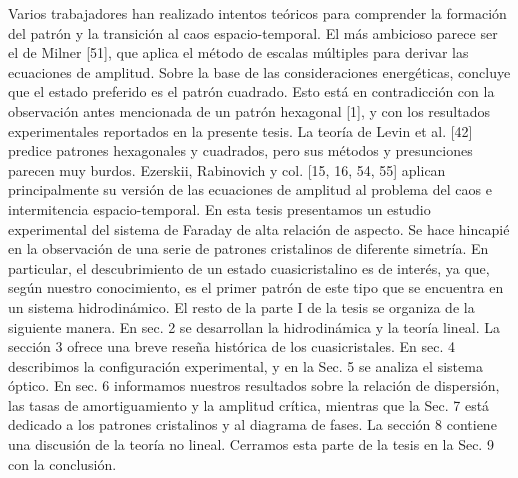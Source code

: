 Varios trabajadores han realizado intentos teóricos para comprender la formación del patrón y la transición al caos espacio-temporal. El más ambicioso parece ser el de Milner [51], que aplica el método de escalas múltiples para derivar las ecuaciones de amplitud. Sobre la base de las consideraciones energéticas, concluye que el estado preferido es el patrón cuadrado. Esto está en contradicción con la observación antes mencionada de un patrón hexagonal [1], y con los resultados experimentales reportados en la presente tesis. La teoría de Levin et al. [42] predice patrones hexagonales y cuadrados, pero sus métodos y presunciones parecen muy burdos. Ezerskii, Rabinovich y col. [15, 16, 54, 55] aplican principalmente su versión de las ecuaciones de amplitud al problema del caos e intermitencia espacio-temporal.
En esta tesis presentamos un estudio experimental del sistema de Faraday de alta relación de aspecto. Se hace hincapié en la observación de una serie de patrones cristalinos de diferente simetría. En particular, el descubrimiento de un estado cuasicristalino es de interés, ya que, según nuestro conocimiento, es el primer patrón de este tipo que se encuentra en un sistema hidrodinámico. El resto de la parte I de la tesis se organiza de la siguiente manera. En sec. 2 se desarrollan la hidrodinámica y la teoría lineal. La sección 3 ofrece una breve reseña histórica de los cuasicristales. En sec. 4 describimos la configuración experimental, y en la Sec. 5 se analiza el sistema óptico. En sec. 6 informamos nuestros resultados sobre la relación de dispersión, las tasas de amortiguamiento y la amplitud crítica, mientras que la Sec. 7 está dedicado a los patrones cristalinos y al diagrama de fases. La sección 8 contiene una discusión de la teoría no lineal. Cerramos esta parte de la tesis en la Sec. 9 con la conclusión.
